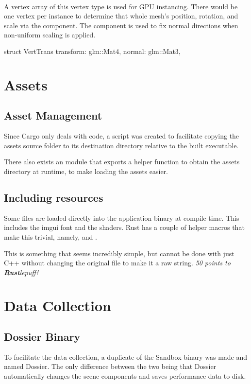 \paragraph{}
A vertex array of this vertex type is used for GPU instancing.
There would be one vertex per instance to determine that whole mesh's position, rotation, and scale via the  component.
The  component is used to fix normal directions when non-uniform scaling is applied.
  \begin{rustcode}
struct VertTrans {
    transform: glm::Mat4,
    normal: glm::Mat3,
}
  \end{rustcode}


\section{Assets}

\subsection{Asset Management}
Since Cargo only deals with code, a  script was created to facilitate copying the assets source folder to its destination directory relative to the built executable.

There also exists an  module that exports a helper function  to obtain the assets directory at runtime, to make loading the assets easier.

\subsection{Including resources}
Some files are loaded directly into the application binary at compile time.
This includes the imgui font and the shaders.
Rust has a couple of helper macros that make this trivial, namely,  and .

This is something that seems incredibly simple, but cannot be done with just C++ without changing the original file to make it a raw string.
\emph{50 points to \textbf{Rust}lepuff!}

\section{Data Collection}

\subsection{Dossier Binary}
To facilitate the data collection, a duplicate of the Sandbox binary was made and named Dossier.
The only difference between the two being that Dossier automatically changes the scene components and saves performance data to disk.

